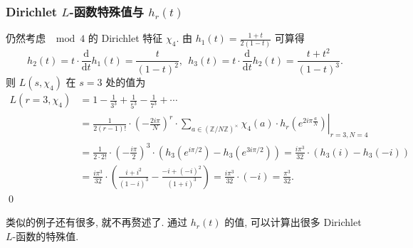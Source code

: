 
\begin{frame}
\frametitle{Dirichlet $L$-函数特殊值与 $h_r(t)$}

仍然考虑 $\mod 4$ 的 Dirichlet 特征 $\chi_4.$ 由 $h_1(t) = \frac{1+t}{2(1-t)}$ 可算得
\[
h_2(t) = t \cdot \frac{\mathrm{d}}{\mathrm{d}t} h_1(t) = \frac{t}{(1-t)^2}, ~~ h_3(t) = t \cdot \frac{\mathrm{d}}{\mathrm{d}t} h_2(t) = \frac{t + t^2}{(1-t)^3}.
\]
则 $L(s, \chi_4)$ 在 $s = 3$ 处的值为
\begin{align*}
L(r=3, \chi_4) & = 1 - \frac{1}{3^3} + \frac{1}{5^3} - \frac{1}{7^3} + \cdots \\
& = \left.\frac{1}{2 (r-1)!} \cdot \left( -\frac{2 i \pi}{N} \right)^r \cdot \sum_{a \in \left( \mathbb{Z}/N\mathbb{Z} \right)^\times} \chi_4(a) \cdot h_r\left( e^{2 i \pi \frac{a}{N}} \right) \right|_{r=3, N=4} \\
& = \frac{1}{2 \cdot 2!} \cdot \left( -\frac{i \pi}{2} \right)^3 \cdot \left( h_3\left( e^{i \pi / 2} \right) - h_3\left( e^{3 i \pi / 2} \right) \right) = \frac{i \pi^3}{32} \cdot \left( h_3(i) - h_3(-i) \right) \\
& = \frac{i \pi^3}{32} \cdot \left( \frac{i + i^2}{(1 - i)^3} - \frac{-i + (-i)^2}{(1 + i)^3} \right) = \frac{i \pi^3}{32} \cdot (-i) = \frac{\pi^3}{32}.
\end{align*}
\qed

\pause

类似的例子还有很多, 就不再赘述了. 通过 $h_r(t)$ 的值, 可以计算出很多 Dirichlet $L$-函数的特殊值.

\end{frame}

\normalmode



